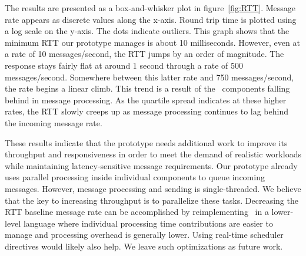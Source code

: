 The results are presented as a box-and-whisker plot in
figure~\ref{fig:RTT}. Message rate appears as discrete values along
the x-axis. Round trip time is plotted using a log scale on the
y-axis. The dots indicate outliers. This graph shows that the minimum
RTT our prototype manages is about 10 milliseconds. However, even at a
rate of 10 messages/second, the RTT jumps by an order of
magnitude. The response stays fairly flat at around 1 second through a
rate of 500 messages/second. Somewhere between this latter rate and
750 messages/second, the rate begins a linear climb.  This trend is a
result of the \name~components falling behind in message processing.
As the quartile spread indicates at these higher rates, the RTT slowly
creeps up as message processing continues to lag behind the incoming
message rate.

These results indicate that the prototype needs additional work to
improve its throughput and responsiveness in order to meet the demand
of realistic workloads while maintaining latency-sensitive message
requirements.  Our prototype already uses parallel processing inside
individual components to queue incoming messages.  However, message
processing and sending is single-threaded.  We believe that the key to
increasing throughput is to parallelize these tasks. Decreasing the
RTT baseline message rate can be accomplished by reimplementing
\name~in a lower-level language where individual processing time
contributions are easier to manage and processing overhead is
generally lower.  Using real-time scheduler directives would likely
also help. We leave such optimizations as future work.

